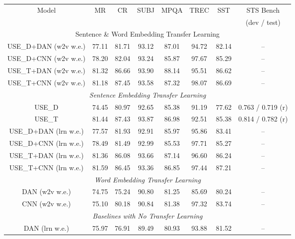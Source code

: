 \documentclass[11pt,a4paper]{article}
\begin{document}
\begin{table*}[ht!]
\small
\begin{center}


\begin{tabular}{|c|c|c|c|c|c|c|c|}
\hline
\multirow{2}{*}{Model} & \multirow{2}{*}{MR} & \multirow{2}{*}{CR} & \multirow{2}{*}{SUBJ} & \multirow{2}{*}{MPQA} & \multirow{2}{*}{TREC} & \multirow{2}{*}{SST} & STS Bench \\
& & & & & & & (dev / test) \\
\hline
\multicolumn{8}{|c|}{Sentence \& Word Embedding Transfer Learning} \\
\hline
USE\_D+DAN (w2v w.e.)  & 77.11  & 81.71  & 93.12  & 87.01  & 94.72  & 82.14 & -- \\
USE\_D+CNN (w2v w.e.)  & 78.20  & 82.04  & 93.24  & 85.87  & 97.67  & 85.29 & -- \\
USE\_T+DAN (w2v w.e.)  & 81.32  & 86.66  & 93.90  & 88.14  & 95.51  & 86.62 & -- \\
USE\_T+CNN (w2v w.e.)  & 81.18  & 87.45  & 93.58  & 87.32  & 98.07  & 86.69 & -- \\
\hline
\multicolumn{8}{|c|}{\emph{Sentence Embedding Transfer Learning}} \\
\hline
USE\_D  & 74.45  & 80.97  & 92.65  & 85.38  & 91.19  & 77.62 & 0.763 / 0.719 (r) \\
USE\_T  & 81.44  & 87.43  & 93.87  & 86.98  & 92.51  & 85.38 & 0.814 / 0.782 (r) \\
USE\_D+DAN (lrn w.e.)  & 77.57  & 81.93  & 92.91  & 85.97  & 95.86  & 83.41 & --  \\
USE\_D+CNN (lrn w.e.)  & 78.49  & 81.49  & 92.99  & 85.53  & 97.71  & 85.27 & --  \\
USE\_T+DAN (lrn w.e.)  & 81.36  & 86.08  & 93.66  & 87.14  & 96.60  & 86.24 & --  \\
USE\_T+CNN (lrn w.e.)  & 81.59  & 86.45  & 93.36  & 86.85  & 97.44  & 87.21 & --  \\
\hline
\multicolumn{8}{|c|}{\emph{Word Embedding Transfer Learning}} \\
\hline
DAN (w2v w.e.)  & 74.75  & 75.24  & 90.80  & 81.25  & 85.69  &  80.24 & -- \\
CNN (w2v w.e.)  & 75.10  & 80.18  & 90.84  & 81.38  & 97.32  &  83.74 & -- \\
\hline
\multicolumn{8}{|c|}{\emph{Baselines with No Transfer Learning}} \\
\hline
DAN (lrn w.e.)  & 75.97  & 76.91  & 89.49  & 80.93  & 93.88  &  81.52 & -- \\

\end{tabular}
\end{center}
\end{table*}
\end{document}
